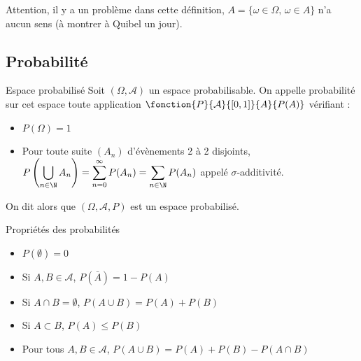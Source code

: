 Attention, il y a un problème dans cette définition, $A = \{ \omega \in \Omega, \, \omega \in A\}$ 
n'a aucun sens (à montrer à Quibel un jour).

\subsection{Probabilité}

\begin{definition}{Espace probabilisé}{}
    Soit $(\Omega, \mathcal A)$ un espace probabilisable. On appelle probabilité 
    sur cet espace toute application $\fonction{P}{\mathcal A}{[0, 1]}{A}{P(A)}$
    vérifiant :
    \begin{itemize}
        \item $P(\Omega) = 1$
        \item Pour toute suite $(A_n)$ d'évènements 2 à 2 disjoints, 
        $\displaystyle P\left( \bigcup_{n \in \N} A_n \right) = \sum_{n = 0 }^{\infty    } P(A_n ) = \sum_{n \in \N    } P(A_n)$
        appelé $\sigma$-additivité.
    \end{itemize}

    On dit alors que $(\Omega, \mathcal A, P)$ est un espace probabilisé. 
\end{definition}

\begin{proposition}{Propriétés des probabilités}{}
    \begin{itemize}
        \item $P(\emptyset) = 0$
        \item Si $A, B \in \mathcal A$, $P(\bar A) = 1 - P(A)$
        \item Si $A \cap B = \emptyset$, $P(A \cup B) = P(A) + P(B)$
        \item Si $A \subset B$, $P(A) \leqslant P(B)$
        \item Pour tous $A, B \in \mathcal A$, $P(A \cup B) = P(A) + P(B) - P(A \cap B)$
    \end{itemize}
\end{proposition}

